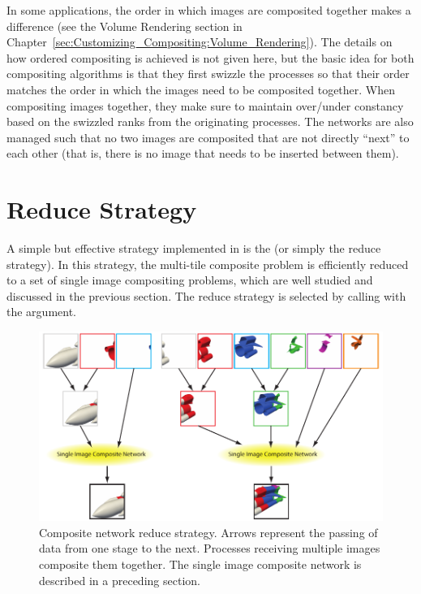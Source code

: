 
In some applications, the order in which images are composited together
makes a difference (see the Volume Rendering section in
Chapter~\ref{sec:Customizing_Compositing:Volume_Rendering}).  The details
on how ordered compositing is achieved is not given here, but the basic
idea for both compositing algorithms is that they first swizzle the
processes so that their order matches the order in which the images need to
be composited together.  When compositing images together, they make sure
to maintain over/under constancy based on the swizzled ranks from the
originating processes.  The networks are also managed such that no two
images are composited that are not directly ``next'' to each other (that
is, there is no image that needs to be inserted between them).



\section{Reduce Strategy}
\label{sec:Strategies:Reduce}


A simple but effective strategy implemented in \IceT is the  (or simply the reduce strategy).  In this
strategy, the multi-tile composite problem is efficiently reduced to a set
of single image compositing problems, which are well studied and discussed
in the previous section.  The reduce strategy is selected by calling
 with the  argument.

\begin{figure}
  \centering
  \includegraphics{images/ReduceComposite}
  \caption[Reduce strategy composite network.]{Composite network reduce
    strategy.  Arrows represent the passing of data from one stage to the
    next.  Processes receiving multiple images composite them together.
    The single image composite network is described in a preceding
    section.}
  \label{fig:ReduceComposite}
\end{figure}

